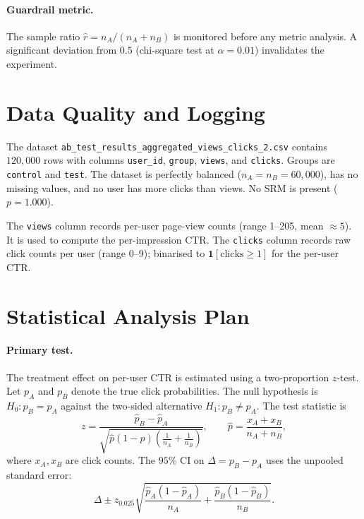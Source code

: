 \documentclass[a4paper,12pt]{extarticle}
\numberwithin{equation}{section}
\begin{document}
\paragraph{Guardrail metric.} The sample ratio $\hat{r} = n_A/(n_A + n_B)$
is monitored before any metric analysis. A significant deviation from
$0.5$ (chi-square test at $\alpha = 0.01$) invalidates the experiment.

\section{Data Quality and Logging}

The dataset \texttt{ab\_test\_results\_aggregated\_views\_clicks\_2.csv}
contains $120{,}000$ rows with columns \texttt{user\_id}, \texttt{group},
\texttt{views}, and \texttt{clicks}. Groups are \texttt{control} and
\texttt{test}. The dataset is perfectly balanced ($n_A = n_B = 60{,}000$),
has no missing values, and no user has more clicks than views. No SRM is
present ($p = 1.000$).

The \texttt{views} column records per-user page-view counts (range 1--205,
mean $\approx 5$). It is used to compute the per-impression CTR. The
\texttt{clicks} column records raw click counts per user (range 0--9);
binarised to $\mathbf{1}[\text{clicks} \geq 1]$ for the per-user CTR.

\section{Statistical Analysis Plan}
\label{sec:stat}

\paragraph{Primary test.} The treatment effect on per-user CTR is estimated
using a two-proportion $z$-test. Let $p_A$ and $p_B$ denote the true click
probabilities. The null hypothesis is $H_0: p_B = p_A$ against the
two-sided alternative $H_1: p_B \neq p_A$. The test statistic is
\[
    z = \frac{\hat{p}_B - \hat{p}_A}{\sqrt{
        \hat{p}(1-\hat{p})\!\left(\frac{1}{n_A}+\frac{1}{n_B}\right)}},
    \qquad
    \hat{p} = \frac{x_A + x_B}{n_A + n_B},
\]
where $x_A, x_B$ are click counts. The $95\%$ CI on $\Delta = p_B - p_A$
uses the unpooled standard error:
\[
    \Delta \pm z_{0.025}
    \sqrt{\frac{\hat{p}_A(1-\hat{p}_A)}{n_A} +
          \frac{\hat{p}_B(1-\hat{p}_B)}{n_B}}.
\]
\end{document}
